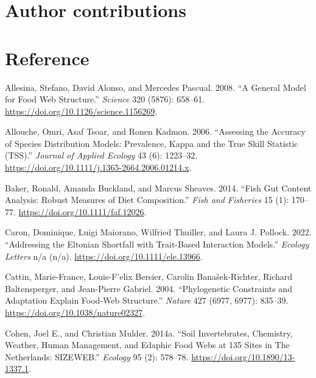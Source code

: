 \documentclass{article}
\newlength{\cslhangindent}
\newlength{\cslentryspacingunit} %
\newenvironment{CSLReferences}[2] %
 {%
  \setlength{\parindent}{0pt}
  \ifodd #1
  \let\oldpar\par
  \def\par{\hangindent=\cslhangindent\oldpar}
  \fi
  \setlength{\parskip}{#2\cslentryspacingunit}
 }%
 {}
\begin{document}
\hypertarget{author-contributions}{%
\section{Author contributions}\label{author-contributions}}

\hypertarget{reference}{%
\section*{Reference}\label{reference}}

\hypertarget{refs}{}
\begin{CSLReferences}{1}{0}
\leavevmode{}%
Allesina, Stefano, David Alonso, and Mercedes Pascual. 2008. {``A
{General Model} for {Food Web Structure}.''} \emph{Science} 320 (5876):
658--61. \url{https://doi.org/10.1126/science.1156269}.

\leavevmode{}%
Allouche, Omri, Asaf Tsoar, and Ronen Kadmon. 2006. {``Assessing the
Accuracy of Species Distribution Models: Prevalence, Kappa and the True
Skill Statistic ({TSS}).''} \emph{Journal of Applied Ecology} 43 (6):
1223--32. \url{https://doi.org/10.1111/j.1365-2664.2006.01214.x}.

\leavevmode{}%
Baker, Ronald, Amanda Buckland, and Marcus Sheaves. 2014. {``Fish Gut
Content Analysis: Robust Measures of Diet Composition.''} \emph{Fish and
Fisheries} 15 (1): 170--77. \url{https://doi.org/10.1111/faf.12026}.

\leavevmode{}%
Caron, Dominique, Luigi Maiorano, Wilfried Thuiller, and Laura J.
Pollock. 2022. {``Addressing the {Eltonian} Shortfall with Trait-Based
Interaction Models.''} \emph{Ecology Letters} n/a (n/a).
\url{https://doi.org/10.1111/ele.13966}.

\leavevmode{}%
Cattin, Marie-France, Louis-F'elix Bersier, Carolin Banašek-Richter,
Richard Baltensperger, and Jean-Pierre Gabriel. 2004. {``Phylogenetic
Constraints and Adaptation Explain Food-Web Structure.''} \emph{Nature}
427 (6977, 6977): 835--39. \url{https://doi.org/10.1038/nature02327}.

\leavevmode{}%
Cohen, Joel E., and Christian Mulder. 2014a. {``Soil Invertebrates,
Chemistry, Weather, Human Management, and Edaphic Food Webs at 135 Sites
in {The Netherlands}: {SIZEWEB}.''} \emph{Ecology} 95 (2): 578--78.
\url{https://doi.org/10.1890/13-1337.1}.


\end{CSLReferences}
\end{document}
